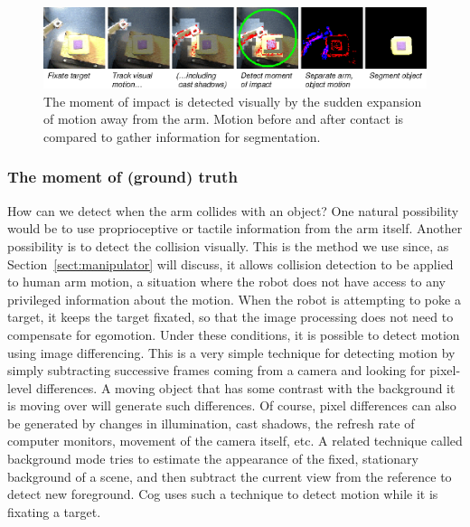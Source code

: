 
\begin{figure}[tbh]
  \begin{center}
\includegraphics[width=\columnwidth]{fig-poke-zoom.eps}
  \end{center}
  \caption{
  \label{fig:poke-zoom}
    The moment of impact is detected visually by the
    sudden expansion of motion away from the arm.  Motion before and
    after contact is compared to gather information for segmentation.
}
\end{figure}


\subsubsection*{The moment of (ground) truth}

How can we detect when the arm collides with an object?  One natural
possibility would be to use proprioceptive or tactile information from
the arm itself.  Another possibility is to detect the collision
visually.  This is the method we use since, as
Section~\ref{sect:manipulator} will discuss, it allows collision
detection to be applied to human arm motion, a situation where the robot
does not have access to any privileged information about the motion.  When the robot 
is attempting to poke a target, it keeps the target fixated,
so that the image processing does not need to compensate for
egomotion.
Under these conditions, it is possible to detect motion using
image differencing.
This is a very simple technique for detecting motion by
simply subtracting successive frames coming from a camera and looking for
pixel-level differences.  A moving object that has some contrast with
the background it is moving over will generate such differences.  Of
course, pixel differences can also be generated by changes in
illumination, cast shadows, the refresh rate of computer monitors, movement of the camera
itself, etc.  A related technique called background mode\ling{} tries to
estimate the appearance of the fixed, stationary background of a 
scene, and then subtract the current view from the reference to 
detect new foreground.  Cog uses such a technique to detect motion
while it is fixating a target.

